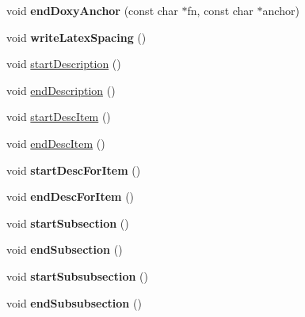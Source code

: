\begin{DoxyCompactItemize}
\item 
\hypertarget{class_output_list_a057bd00d784fc019acec20fc9eee199d}{void {\bfseries end\-Doxy\-Anchor} (const char $\ast$fn, const char $\ast$anchor)}\label{class_output_list_a057bd00d784fc019acec20fc9eee199d}

\item 
\hypertarget{class_output_list_a0024111efcef4c86c58a90626442526b}{void {\bfseries write\-Latex\-Spacing} ()}\label{class_output_list_a0024111efcef4c86c58a90626442526b}

\item 
void \hyperlink{class_output_list_ae87205938a124b2eac0d798631d4e5e6}{start\-Description} ()
\item 
void \hyperlink{class_output_list_a5a0a6eb710a6b87c5dd8ea82b7a19dc4}{end\-Description} ()
\item 
void \hyperlink{class_output_list_ab8a6797fe2e4cb968a4c13eea7c4c968}{start\-Desc\-Item} ()
\item 
void \hyperlink{class_output_list_a080b8f2fa36e665da60bcfa982386ac8}{end\-Desc\-Item} ()
\item 
\hypertarget{class_output_list_aaeedab997793b96cdfc94f8b628d5a80}{void {\bfseries start\-Desc\-For\-Item} ()}\label{class_output_list_aaeedab997793b96cdfc94f8b628d5a80}

\item 
\hypertarget{class_output_list_a5cae5c5213649bfad6105e91ac818870}{void {\bfseries end\-Desc\-For\-Item} ()}\label{class_output_list_a5cae5c5213649bfad6105e91ac818870}

\item 
\hypertarget{class_output_list_a0e68709c755fc3aef30de8ee8ccb3080}{void {\bfseries start\-Subsection} ()}\label{class_output_list_a0e68709c755fc3aef30de8ee8ccb3080}

\item 
\hypertarget{class_output_list_a3fb66f3466cdfc1a0a77b8b6282dc0e8}{void {\bfseries end\-Subsection} ()}\label{class_output_list_a3fb66f3466cdfc1a0a77b8b6282dc0e8}

\item 
\hypertarget{class_output_list_a990a0621ea42a9028bb4162b40be4f61}{void {\bfseries start\-Subsubsection} ()}\label{class_output_list_a990a0621ea42a9028bb4162b40be4f61}

\item 
\hypertarget{class_output_list_af3a0a92b5bad729bb6eeafb07ca54b8f}{void {\bfseries end\-Subsubsection} ()}\label{class_output_list_af3a0a92b5bad729bb6eeafb07ca54b8f}


\end{DoxyCompactItemize}

